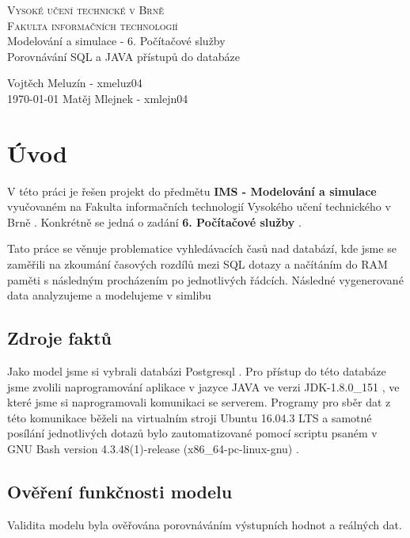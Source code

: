 \documentclass[a4paper, 11pt]{article}
\begin{document}
\thispagestyle{empty}
\begin{center}
\Huge
\textsc{Vysoké učení technické v Brně}\\
\huge
\textsc{Fakulta informačních technologií}\\
\LARGE
{}
Modelování a simulace - 6. Počítačové služby\\ \Huge Porovnávání SQL a JAVA přístupů do databáze
\end{center}

{
\LARGE \hfill
Vojtěch Meluzín - xmeluz04\\
\today \hfill
Matěj Mlejnek - xmlejn04}

\newpage
\thispagestyle{empty}

\tableofcontents

\newpage
\setcounter{page}{1}
\section{Úvod}
V této práci je řešen projekt do předmětu \textbf{IMS - Modelování a simulace} \cite{ims_web} vyučovaném na Fakulta informačních technologií Vysokého učení technického v Brně \cite{fit_web}. Konkrétně se jedná o zadání \textbf{6. Počítačové služby} \cite{zadani_web}.

Tato práce se věnuje problematice vyhledávacích časů nad databází, kde jsme se zaměřili na zkoumání časových rozdílů mezi SQL dotazy a načítáním do RAM paměti s následným procházením po jednotlivých řádcích. Následné vygenerované data analyzujeme a modelujeme v simlibu\cite{simlib_web, simlib_zdroj}
\subsection{Zdroje faktů}
Jako model jsme si vybrali databázi Postgresql \cite{postgresql_web}. Pro přístup do této databáze jsme zvolili naprogramování aplikace v jazyce JAVA \cite{java_web} ve verzi JDK-1.8.0\_151 \cite{java_jdk_version}, ve které jsme si naprogramovali komunikaci se serverem. Programy pro sběr dat z této komunikace běželi na virtualním stroji Ubuntu 16.04.3 LTS \cite{ubuntu_web} a samotné posílání jednotlivých dotazů bylo zautomatizované pomocí scriptu psaném v GNU Bash version 4.3.48(1)-release (x86\_64-pc-linux-gnu) \cite{bash_web}.

\subsection{Ověření funkčnosti modelu}
Validita modelu byla ověřována porovnáváním výstupních hodnot a reálných dat.
\end{document}
